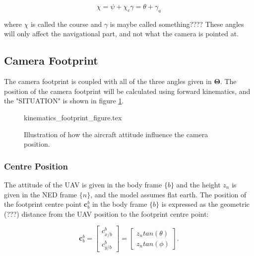 \begin{subequations}
\begin{equation}
	\chi = \psi + \chi_c
\end{equation}
\begin{equation}
	\gamma = \theta + \gamma_a
\end{equation}
\end{subequations}
	
where $\chi$ is called the course and $\gamma$ is maybe called something???? These angles will only affect the navigational part, and not what the camera is pointed at.

\subsection{Camera Footprint}

The camera footprint is coupled with all of the three angles given in $\bm{\Theta}$. The position of the camera footprint will be calculated using forward kinematics, and the "SITUATION" is shown in figure \ref{fig:footprint_centre}.

\begin{figure}
	{kinematics_footprint_figure.tex}
	\caption{Illustration of how the aircraft attitude influence the camera position.}
	\label{fig:footprint_centre}
\end{figure}

\subsubsection{Centre Position}

The attitude of the UAV is given in the body frame $\{b\}$ and the height $z_n$ is given in the NED frame $\{n\}$, and the model assumes flat earth. The position of the footprint centre point $\mathbf{c}_b^b$ in the body frame $\{b\}$ is expressed as the geometric (???) distance from the UAV position to the footprint centre point:

\begin{equation}
	\label{eq:camera_position_body}
	\mathbf{c}_b^b =
	\begin{bmatrix}
		c_{x/b}^b \\ c_{y/b}^b
	\end{bmatrix}
	=
	\begin{bmatrix}
		z_n tan(\theta) \\ z_n tan(\phi)
	\end{bmatrix}.
\end{equation}


